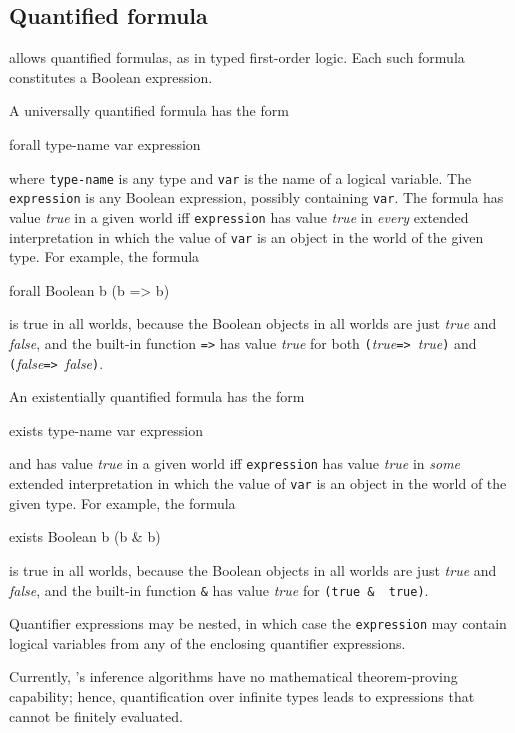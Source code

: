 \documentclass[12pt]{article}
\begin{document}
\subsection{Quantified formula}\label{quantifier-section}
\bl allows quantified formulas, as in typed first-order logic. 
Each such formula constitutes a Boolean expression.

A universally quantified formula has the form
\begin{blogcode}
forall type-name var expression
\end{blogcode}
where {\tt type-name} is any type and {\tt var} is the name of a
logical variable. The {\tt expression} is any Boolean expression,
possibly containing {\tt var}. The formula has value {\it true}
in a given world iff {\tt expression} has value {\it true}
in {\em every} extended interpretation in which the value of {\tt var} 
is an object in the world of the given type. For example, the formula
\begin{blogcode}
forall Boolean b (b => b)
\end{blogcode}
is true in all worlds, because the Boolean objects in all worlds are 
just {\it true} and {\it false}, and the built-in function {\tt =>}
has value {\it true} for both {\tt (}{\it true}{\tt => }{\it true}{\tt )}
and {\tt (}{\it false}{\tt => }{\it false}{\tt )}.

An existentially quantified formula has the form
\begin{blogcode}
exists type-name var expression
\end{blogcode}
and has value {\it true}
in a given world iff {\tt expression} has value {\it true}
in {\em some} extended interpretation in which the value of {\tt var} 
is an object in the world of the given type. For example, the formula
\begin{blogcode}
exists Boolean b (b & b)
\end{blogcode}
is true in all worlds, because the Boolean objects in all worlds are 
just {\it true} and {\it false}, and the built-in function \verb|&| has value {\it true} for \verb|(true &  true)|.


Quantifier expressions may be nested, in which case
the {\tt expression} may contain logical variables from any of the
enclosing quantifier expressions.

Currently, \bl's inference algorithms have no mathematical
theorem-proving capability; hence, quantification over infinite types
leads to expressions that cannot be finitely evaluated.
\end{document}
